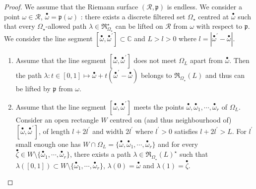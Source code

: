 \documentclass[11pt, english]{smfart}
\theoremstyle{definition}
\begin{document}
\begin{proof}
We assume that the  Riemann surface $(\mathscr{R}, \mathfrak{p})$ is
endless. We consider a point  $\omega \in
\mathscr{R}$, ${ {\stackrel{\bullet}{\omega}} } = \mathfrak{p} (\omega)$ :   there
exists a discrete filtered set $\Omega_\star$ centred at ${ {\stackrel{\bullet}{\omega}} }$  such that
every $\Omega_\star$-allowed path $\lambda \in
\mathfrak{R}_{\Omega_\star}^\star$   can be lifted
  on $\mathscr{R}$  from $\omega$ with respect to $\mathfrak{p}$. We consider the line segment
  $[{ {\stackrel{\bullet}{\omega}} }, { {\stackrel{\bullet}{\omega}} }^\prime]  \subset \mathbb{C}$ and  $L > l>0$  where $l= |{ {\stackrel{\bullet}{\omega}} }^\prime -
  { {\stackrel{\bullet}{\omega}} }|$.
\begin{enumerate}
\item  Assume  that  the line segment $[{ {\stackrel{\bullet}{\omega}} }, { {\stackrel{\bullet}{\omega}} }^\prime]$ does not
  meet $\Omega_L$ apart from ${ {\stackrel{\bullet}{\omega}} }$.  Then the path $\lambda : t \in
  [0,1] \mapsto { {\stackrel{\bullet}{\omega}} } + t({ {\stackrel{\bullet}{\omega}} }^\prime - { {\stackrel{\bullet}{\omega}} })$ belongs to
  $\mathfrak{R}_{\Omega_\star}(L)$  and thus can be lifted by
  $\mathfrak{p}$ from $\omega$.
\item  Assume  that the line segment $[{ {\stackrel{\bullet}{\omega}} }, { {\stackrel{\bullet}{\omega}} }^\prime]$
  meets the points ${ {\stackrel{\bullet}{\omega}} }, { {\stackrel{\bullet}{\omega}} }_1, \cdots, { {\stackrel{\bullet}{\omega}} }_r$ of
  $\Omega_L$. Consider an open rectangle $W$ centred on (and thus neighbourhood of)
  $[{ {\stackrel{\bullet}{\omega}} }, { {\stackrel{\bullet}{\omega}} }^\prime]$, of length  $l+2l^\prime$ and width
$2l^\prime$ where $l^\prime>0$ satisfies $l+2l^\prime >L$. For
$l^\prime$ small enough one has $W \cap \Omega_L = \{{ {\stackrel{\bullet}{\omega}} }, { {\stackrel{\bullet}{\omega}} }_1, \cdots,
{ {\stackrel{\bullet}{\omega}} }_r\}$ and for every ${{ {\stackrel{\bullet}{\zeta}} }  \in W \setminus \{{ {\stackrel{\bullet}{\omega}} }_1, \cdots,
{ {\stackrel{\bullet}{\omega}} }_r\}}$,  there exists a path $\lambda \in
\mathfrak{R}_{\Omega_\star}(L)^\star$ such that $\lambda([0,1]) \subset
W \setminus \{{ {\stackrel{\bullet}{\omega}} }_1, \cdots,
{ {\stackrel{\bullet}{\omega}} }_r\}$, ${\lambda(0) = { {\stackrel{\bullet}{\omega}} }}$  and $\lambda(1) = { {\stackrel{\bullet}{\zeta}} }$.


\end{enumerate}
\end{proof}
\end{document}
